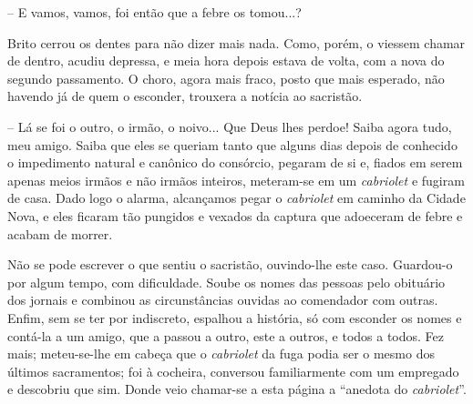 -- E vamos, vamos, foi então que a febre os tomou...?

Brito cerrou os dentes para não dizer mais nada. Como, porém, o viessem
chamar de dentro, acudiu depressa, e meia hora depois estava de volta,
com a nova do segundo passamento. O choro, agora mais fraco, posto que
mais esperado, não havendo já de quem o esconder, trouxera a notícia ao
sacristão.

-- Lá se foi o outro, o irmão, o noivo... Que Deus lhes perdoe! Saiba
agora tudo, meu amigo. Saiba que eles se queriam tanto que alguns dias
depois de conhecido o impedimento natural e canônico do consórcio,
pegaram de si e, fiados em serem apenas meios irmãos e não irmãos
inteiros, meteram-se em um \emph{cabriolet} e fugiram de casa. Dado logo
o alarma, alcançamos pegar o \emph{cabriolet} em caminho da Cidade Nova,
e eles ficaram tão pungidos e vexados da captura que adoeceram de febre
e acabam de morrer.

Não se pode escrever o que sentiu o sacristão, ouvindo-lhe este caso.
Guardou-o por algum tempo, com dificuldade. Soube os nomes das pessoas
pelo obituário dos jornais e combinou as circunstâncias ouvidas ao
comendador com outras. Enfim, sem se ter por indiscreto, espalhou a
história, só com esconder os nomes e contá-la a um amigo, que a passou a
outro, este a outros, e todos a todos. Fez mais; meteu-se-lhe em cabeça
que o \emph{cabriolet} da fuga podia ser o mesmo dos últimos
sacramentos; foi à cocheira, conversou familiarmente com um empregado e
descobriu que sim. Donde veio chamar-se a esta página a ``anedota do
\emph{cabriolet}''.
